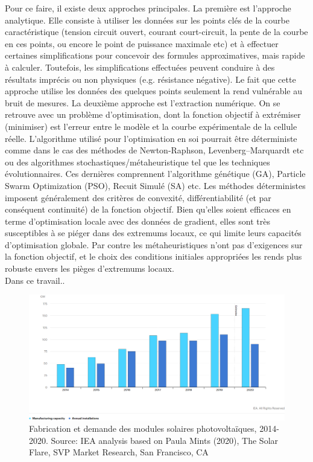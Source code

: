 Pour ce faire, il existe deux approches principales. La première est l'approche analytique. Elle consiste à utiliser les données sur les points clés de la courbe caractéristique (tension circuit ouvert, courant court-circuit, la pente de la courbe en ces points, ou encore le point de puissance maximale etc) et à effectuer certaines simplifications pour concevoir des formules approximatives, mais rapide à calculer. Toutefois, les simplifications effectuées peuvent conduire à des résultats imprécis ou non physiques (e.g. résistance négative). Le fait que cette approche utilise les données des quelques points seulement la rend vulnérable au bruit de mesures. La deuxième approche est l'extraction numérique. On se retrouve avec un problème d'optimisation, dont la fonction objectif à extrémiser (minimiser) est l'erreur entre le modèle et la courbe expérimentale de la cellule réelle. L'algorithme utilisé pour l'optimisation en soi pourrait être déterministe comme dans le cas des méthodes de Newton-Raphson, Levenberg–Marquardt etc ou des algorithmes stochastiques/métaheuristique tel que les techniques évolutionnaires. Ces dernières comprennent l'algorithme génétique (GA), Particle Swarm Optimization (PSO), Recuit Simulé (SA) etc. Les méthodes déterministes imposent généralement des critères de convexité, différentiabilité (et par conséquent continuité) de la fonction objectif. Bien qu'elles soient efficaces en terme d'optimisation locale avec des données de gradient, elles sont très susceptibles à se piéger dans des extremums locaux, ce qui limite leurs capacités d'optimisation globale. Par contre les métaheuristiques n'ont pas d'exigences sur la fonction objectif, et le choix des conditions initiales appropriées les rends plus robuste envers les pièges d'extremums locaux.\\
Dans ce travail..
\begin{figure}
  \begin{center}
    \includegraphics[width=\textwidth]{resources/ieapv.png}
    \caption{Fabrication et demande des modules solaires photovoltaïques, 2014-2020. Source: IEA analysis based on Paula Mints (2020), The Solar Flare, SVP Market Research, San Francisco, CA \cite{iea2020}}
    \label{fig:ieapv}
  \end{center}
\end{figure}
